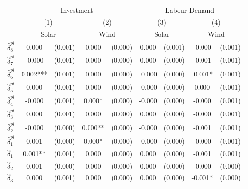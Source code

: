 {
\def\sym#1{\ifmmode^{#1}\else\(^{#1}\)\fi}
\begin{tabular}{l*{4}{cc}}
\toprule
            &\multicolumn{4}{c}{Investment}                           &\multicolumn{4}{c}{Labour Demand}                        \\\cmidrule(lr){2-5}\cmidrule(lr){6-9}
            &\multicolumn{2}{c}{(1)}     &\multicolumn{2}{c}{(2)}     &\multicolumn{2}{c}{(3)}     &\multicolumn{2}{c}{(4)}     \\
            &\multicolumn{2}{c}{Solar}   &\multicolumn{2}{c}{Wind}    &\multicolumn{2}{c}{Solar}   &\multicolumn{2}{c}{Wind}    \\
\midrule
$\hat{\delta}_8^{pl}$&       0.000   &     (0.001)&       0.000   &     (0.000)&       0.000   &     (0.001)&      -0.000   &     (0.001)\\
$\hat{\delta}_7^{pl}$&      -0.000   &     (0.001)&       0.000   &     (0.000)&       0.000   &     (0.000)&      -0.001   &     (0.001)\\
$\hat{\delta}_6^{pl}$&       0.002***&     (0.001)&       0.000   &     (0.000)&      -0.000   &     (0.000)&      -0.001*  &     (0.001)\\
$\hat{\delta}_5^{pl}$&       0.000   &     (0.001)&       0.000   &     (0.000)&      -0.000   &     (0.000)&       0.000   &     (0.001)\\
$\hat{\delta}_4^{pl}$&      -0.000   &     (0.001)&       0.000*  &     (0.000)&      -0.000   &     (0.000)&      -0.000   &     (0.001)\\
$\hat{\delta}_3^{pl}$&       0.000   &     (0.001)&       0.000   &     (0.000)&       0.000   &     (0.000)&      -0.000   &     (0.001)\\
$\hat{\delta}_2^{pl}$&      -0.000   &     (0.000)&       0.000** &     (0.000)&      -0.000   &     (0.000)&      -0.001   &     (0.001)\\
$\hat{\delta}_1^{pl}$&       0.001   &     (0.000)&       0.000*  &     (0.000)&      -0.000   &     (0.000)&      -0.000   &     (0.001)\\
$\hat{\delta}_1$&       0.001** &     (0.001)&       0.000   &     (0.000)&       0.000   &     (0.000)&      -0.001   &     (0.001)\\
$\hat{\delta}_2$&       0.001   &     (0.000)&       0.000   &     (0.000)&       0.000   &     (0.000)&      -0.000   &     (0.000)\\
$\hat{\delta}_3$&       0.000   &     (0.001)&       0.000   &     (0.000)&       0.000   &     (0.000)&      -0.001*  &     (0.000)\\

\end{tabular}}
